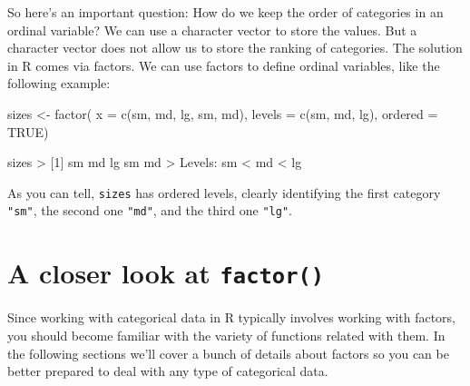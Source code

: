 \documentclass[
]{book}
\newenvironment{Shaded}{\begin{snugshade}}{\end{snugshade}}
\newcommand{\AttributeTok}[1]{\textcolor[rgb]{0.77,0.63,0.00}{#1}}
\newcommand{\ConstantTok}[1]{\textcolor[rgb]{0.00,0.00,0.00}{#1}}
\newcommand{\DecValTok}[1]{\textcolor[rgb]{0.00,0.00,0.81}{#1}}
\newcommand{\FunctionTok}[1]{\textcolor[rgb]{0.00,0.00,0.00}{#1}}
\newcommand{\NormalTok}[1]{#1}
\newcommand{\OtherTok}[1]{\textcolor[rgb]{0.56,0.35,0.01}{#1}}
\newcommand{\SpecialCharTok}[1]{\textcolor[rgb]{0.00,0.00,0.00}{#1}}
\newcommand{\StringTok}[1]{\textcolor[rgb]{0.31,0.60,0.02}{#1}}
\begin{document}
So here's an important question: How do we keep the order of categories in an
ordinal variable? We can use a character vector to store the values. But a
character vector does not allow us to store the ranking of categories. The
solution in R comes via factors. We can use factors to define ordinal variables,
like the following example:

\begin{Shaded}
\begin{Highlighting}[]
\NormalTok{sizes }\OtherTok{\textless{}{-}} \FunctionTok{factor}\NormalTok{(}
  \AttributeTok{x =} \FunctionTok{c}\NormalTok{(}\StringTok{\textquotesingle{}sm\textquotesingle{}}\NormalTok{, }\StringTok{\textquotesingle{}md\textquotesingle{}}\NormalTok{, }\StringTok{\textquotesingle{}lg\textquotesingle{}}\NormalTok{, }\StringTok{\textquotesingle{}sm\textquotesingle{}}\NormalTok{, }\StringTok{\textquotesingle{}md\textquotesingle{}}\NormalTok{),}
  \AttributeTok{levels =} \FunctionTok{c}\NormalTok{(}\StringTok{\textquotesingle{}sm\textquotesingle{}}\NormalTok{, }\StringTok{\textquotesingle{}md\textquotesingle{}}\NormalTok{, }\StringTok{\textquotesingle{}lg\textquotesingle{}}\NormalTok{),}
  \AttributeTok{ordered =} \ConstantTok{TRUE}\NormalTok{)}

\NormalTok{sizes}
\SpecialCharTok{\textgreater{}}\NormalTok{ [}\DecValTok{1}\NormalTok{] sm md lg sm md}
\SpecialCharTok{\textgreater{}}\NormalTok{ Levels}\SpecialCharTok{:}\NormalTok{ sm }\SpecialCharTok{\textless{}}\NormalTok{ md }\SpecialCharTok{\textless{}}\NormalTok{ lg}
\end{Highlighting}
\end{Shaded}

As you can tell, \texttt{sizes} has ordered levels, clearly identifying the first
category \texttt{"sm"}, the second one \texttt{"md"}, and the third one \texttt{"lg"}.

\hypertarget{a-closer-look-at-factor}{%
\section{\texorpdfstring{A closer look at \texttt{factor()}}{A closer look at factor()}}\label{a-closer-look-at-factor}}

Since working with categorical data in R typically involves working with factors,
you should become familiar with the variety of functions related with them. In
the following sections we'll cover a bunch of details about factors so you can
be better prepared to deal with any type of categorical data.
\end{document}
